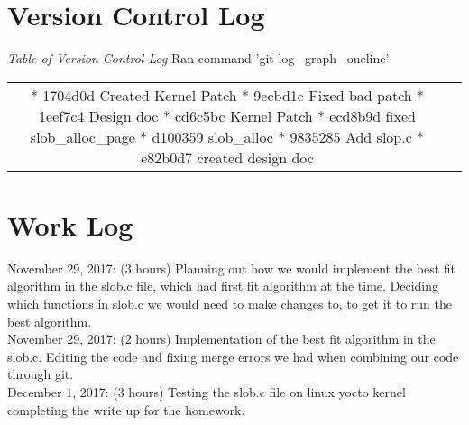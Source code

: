 \documentclass{article}
\begin{document}
\section*{Version Control Log}
\textit{Table of Version Control Log} Ran command 'git log --graph --oneline'
\newline
\begin{center}
\begin{tabular}{ c c }
* 1704d0d Created Kernel Patch
* 9ecbd1c Fixed bad patch
* 1eef7c4 Design doc
* cd6c5bc Kernel Patch
* ecd8b9d fixed slob_alloc_page
* d100359 slob_alloc
* 9835285 Add slop.c
* e82b0d7 created design doc
\end{tabular}
\end{center}

\section*{Work Log}
November 29, 2017: (3 hours) Planning out how we would implement the best fit algorithm in the slob.c file, which had first fit algorithm at the time. Deciding which functions in slob.c we would need to make changes to, to get it to run the best algorithm.  \\
November 29, 2017: (2 hours) Implementation of the best fit algorithm in the slob.c. Editing the code and fixing merge errors we had when combining our code through git. \\
December 1, 2017: (3 hours) Testing the slob.c file on linux yocto kernel completing the write up for the homework.
\end{document}
